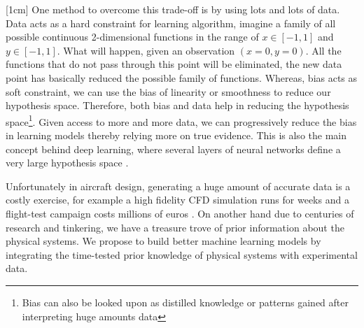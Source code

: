 [1cm]
One method to overcome this trade-off is by using lots and lots of data. Data acts as a hard constraint for learning algorithm, imagine a family of all possible continuous 2-dimensional functions in the range of $x \in [-1, 1]$ and $y \in [-1, 1]$. What will happen, given an observation $(x = 0, y = 0)$. All the functions that do not pass through this point will be eliminated, the new data point has basically reduced the possible family of functions. Whereas, bias acts as soft constraint, we can use the bias of linearity or smoothness to reduce our hypothesis space. Therefore, both bias and data help in reducing the hypothesis space\footnote{Bias can also be looked upon as distilled knowledge or patterns gained after interpreting huge amounts data}. Given access to more and more data, we can progressively reduce the bias in learning models thereby relying more on true evidence. This is also the main concept behind deep learning, where several layers of neural networks define a very large hypothesis space \cite{Goodfellow-et-al-2016, lecun2015deep}. 

Unfortunately in aircraft design, generating a huge amount of accurate data is a costly exercise, for example a high fidelity CFD simulation runs for weeks \cite{murthy2014computational, jameson2012computational} and a flight-test campaign costs millions of euros \cite{fox2004test}. On another hand due to centuries of research and tinkering, we have a treasure trove of prior information about the physical systems. We propose to build better machine learning models by integrating the time-tested prior knowledge of physical systems with experimental data. 

